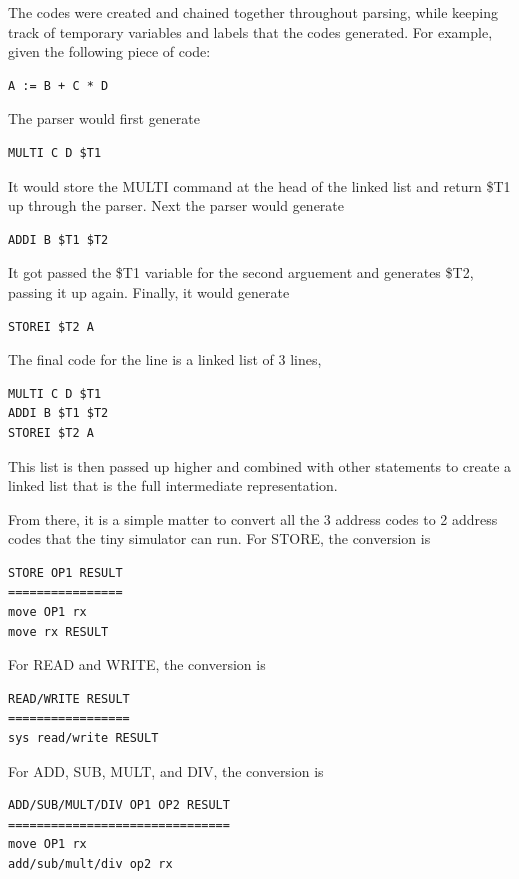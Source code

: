 \documentclass[12pt]{article}
\begin{document}
            The codes were created and chained together throughout parsing, while keeping track of temporary variables and labels that the codes generated.
            For example, given the following piece of code:
            \begin{verbatim}
A := B + C * D
            \end{verbatim}
            The parser would first generate
            \begin{verbatim}
MULTI C D $T1
            \end{verbatim}
            It would store the MULTI command at the head of the linked list and return \$T1 up through the parser.
            Next the parser would generate
            \begin{verbatim}
ADDI B $T1 $T2
            \end{verbatim}
            It got passed the \$T1 variable for the second arguement and generates \$T2, passing it up again.
            Finally, it would generate
            \begin{verbatim}
STOREI $T2 A
            \end{verbatim}
            The final code for the line is a linked list of 3 lines,
            \begin{verbatim}
MULTI C D $T1
ADDI B $T1 $T2
STOREI $T2 A
            \end{verbatim}
            This list is then passed up higher and combined with other statements to create a linked list that is the full intermediate representation.

            From there, it is a simple matter to convert all the 3 address codes to 2 address codes that the tiny simulator can run.
            For STORE, the conversion is
            \begin{verbatim}
STORE OP1 RESULT
================
move OP1 rx
move rx RESULT
            \end{verbatim}

            For READ and WRITE, the conversion is
            \begin{verbatim}
READ/WRITE RESULT
=================
sys read/write RESULT
            \end{verbatim}

            For ADD, SUB, MULT, and DIV, the conversion is
            \begin{verbatim}
ADD/SUB/MULT/DIV OP1 OP2 RESULT
===============================
move OP1 rx
add/sub/mult/div op2 rx
            \end{verbatim}
\end{document}
